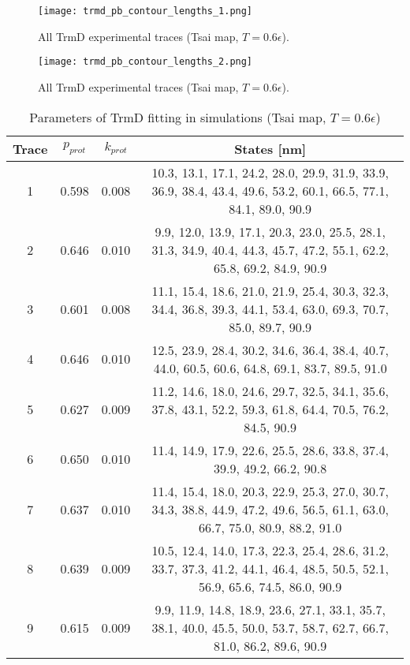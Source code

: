 \begin{figure}
    \centering
    \texttt{[image: trmd\_pb\_contour\_lengths\_1.png]}
    \caption{All TrmD experimental traces (Tsai map, $T=0.6\epsilon$).}
    \label{fig:trmd-pb-cl1}
\end{figure}

\begin{figure}
    \centering
    \texttt{[image: trmd\_pb\_contour\_lengths\_2.png]}
    \caption{All TrmD experimental traces (Tsai map, $T=0.6\epsilon$).}
    \label{fig:trmd-pb-cl2}
\end{figure}

\begin{table}
    \tiny
    \centering
    \caption{Parameters of TrmD fitting in simulations (Tsai map, $T=0.6\epsilon$)}
    \label{tab:trmd-pb-parameters}
    \begin{tabular}{c|c|c|c}
        \textbf{Trace} & \textbf{$p_{prot}$} & \textbf{$k_{prot}$} & \textbf{States [nm]}\\\hline
        1 & 0.598 & 0.008 & 10.3, 13.1, 17.1, 24.2, 28.0, 29.9, 31.9, 33.9, 36.9, 38.4, 43.4, 49.6, 53.2, 60.1, 66.5, 77.1, 84.1, 89.0, 90.9\\
        2 & 0.646 & 0.010 & 9.9, 12.0, 13.9, 17.1, 20.3, 23.0, 25.5, 28.1, 31.3, 34.9, 40.4, 44.3, 45.7, 47.2, 55.1, 62.2, 65.8, 69.2, 84.9, 90.9\\
        3 & 0.601 & 0.008 & 11.1, 15.4, 18.6, 21.0, 21.9, 25.4, 30.3, 32.3, 34.4, 36.8, 39.3, 44.1, 53.4, 63.0, 69.3, 70.7, 85.0, 89.7, 90.9\\
        4 & 0.646 & 0.010 & 12.5, 23.9, 28.4, 30.2, 34.6, 36.4, 38.4, 40.7, 44.0, 60.5, 60.6, 64.8, 69.1, 83.7, 89.5, 91.0\\
        5 & 0.627 & 0.009 & 11.2, 14.6, 18.0, 24.6, 29.7, 32.5, 34.1, 35.6, 37.8, 43.1, 52.2, 59.3, 61.8, 64.4, 70.5, 76.2, 84.5, 90.9\\
        6 & 0.650 & 0.010 & 11.4, 14.9, 17.9, 22.6, 25.5, 28.6, 33.8, 37.4, 39.9, 49.2, 66.2, 90.8\\
        7 & 0.637 & 0.010 & 11.4, 15.4, 18.0, 20.3, 22.9, 25.3, 27.0, 30.7, 34.3, 38.8, 44.9, 47.2, 49.6, 56.5, 61.1, 63.0, 66.7, 75.0, 80.9, 88.2, 91.0\\
        8 & 0.639 & 0.009 & 10.5, 12.4, 14.0, 17.3, 22.3, 25.4, 28.6, 31.2, 33.7, 37.3, 41.2, 44.1, 46.4, 48.5, 50.5, 52.1, 56.9, 65.6, 74.5, 86.0, 90.9\\
        9 & 0.615 & 0.009 & 9.9, 11.9, 14.8, 18.9, 23.6, 27.1, 33.1, 35.7, 38.1, 40.0, 45.5, 50.0, 53.7, 58.7, 62.7, 66.7, 81.0, 86.2, 89.6, 90.9\\

\end{tabular}
\end{table}
